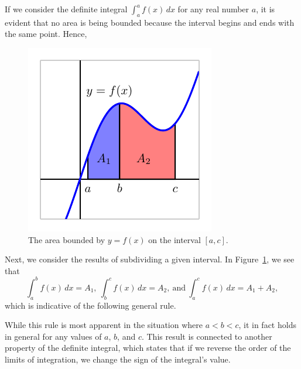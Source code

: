If we consider the definite integral $\int_a^a f(x) \, dx$ for any real number $a$, it is evident that no area is being bounded because the interval begins and ends with the same point.  Hence, 

\vspace*{5pt}
\noindent {}
\vspace*{1pt}
 
\begin{figure}[h]
\begin{center}
\includegraphics{figures/4_3_AdditiveProp}
\caption{The area bounded by $y=f(x)$ on the interval $[a,c]$.} \label{F:4.3.AdditiveProp}
\end{center}
\end{figure}

Next, we consider the results of subdividing a given interval. In Figure~\ref{F:4.3.AdditiveProp}, we see that
$$\int_a^b f(x) \, dx = A_1, \ \int_b^c f(x) \, dx = A_2, \ \mbox{and} \ \int_a^c f(x) \, dx = A_1 + A_2,$$ 
which is indicative of the following general rule.
  
\vspace*{5pt}
\noindent {}
\vspace*{1pt}

\noindent While this rule is most apparent in the situation where $a < b < c$, it in fact holds in general for any values of $a$, $b$, and $c$.  This result is connected to another property of the definite integral, which states that if we reverse the order of the limits of integration, we change the sign of the integral's value.


